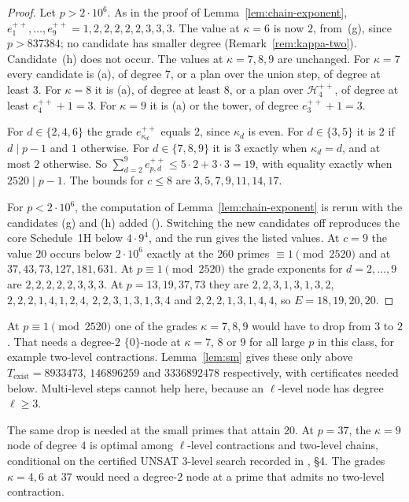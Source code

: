 \begin{proof}
Let $p > 2\cdot10^6$. As in the proof of Lemma~\ref{lem:chain-exponent}, $e^{++}_1,\dots,e^{++}_9 = 1,2,2,2,2,2,3,3,3$. The value at $\kappa = 6$ is now $2$, from~(g), since $p > 837384$; no candidate has smaller degree (Remark~\ref{rem:kappa-two}). Candidate~(h) does not occur. The values at $\kappa = 7, 8, 9$ are unchanged. For $\kappa = 7$ every candidate is (a), of degree $7$, or a plan over the union step, of degree at least $3$. For $\kappa = 8$ it is (a), of degree at least $8$, or a plan over $\mathcal H^{++}_4$, of degree at least $e^{++}_4 + 1 = 3$. For $\kappa = 9$ it is (a) or the tower, of degree $e^{++}_3 + 1 = 3$.

For $d \in \{2,4,6\}$ the grade $e^{++}_{\kappa_d}$ equals $2$, since $\kappa_d$ is even. For $d \in \{3,5\}$ it is $2$ if $d \mid p-1$ and $1$ otherwise. For $d \in \{7,8,9\}$ it is $3$ exactly when $\kappa_d = d$, and at most $2$ otherwise. So $\sum_{d=2}^9e^{++}_{p,d} \le 5\cdot2 + 3\cdot3 = 19$, with equality exactly when $2520 \mid p-1$. The bounds for $c \le 8$ are $3,5,7,9,11,14,17$.

For $p < 2\cdot10^6$, the computation of Lemma~\ref{lem:chain-exponent} is rerun with the candidates (g) and (h) added (). Switching the new candidates off reproduces the core Schedule~1H below $4\cdot9^4$, and the run gives the listed values. At $c = 9$ the value $20$ occurs below $2\cdot10^6$ exactly at the $260$ primes $\equiv 1 \pmod{2520}$ and at $37, 43, 73, 127, 181, 631$. At $p \equiv 1 \pmod{2520}$ the grade exponents for $d = 2,\dots,9$ are $2,2,2,2,2,3,3,3$. At $p = 13, 19, 37, 73$ they are $2,2,3,1,3,1,3,2$, $2,2,2,1,4,1,2,4$, $2,2,3,1,3,1,3,4$ and $2,2,2,1,3,1,4,4$, so $E = 18, 19, 20, 20$.
\end{proof}

\begin{remark}
\label{rem:below-20}
At $p \equiv 1 \pmod{2520}$ one of the grades $\kappa = 7, 8, 9$ would have to drop from $3$ to $2$. That needs a degree-$2$ $\{0\}$-node at $\kappa = 7$, $8$ or $9$ for all large $p$ in this class, for example two-level contractions. Lemma~\ref{lem:sm} gives these only above $T_{\mathrm{exist}} = 8933473$, $146896259$ and $3336892478$ respectively, with certificates needed below. Multi-level steps cannot help here, because an $\ell$-level node has degree $\ell \ge 3$.

The same drop is needed at the small primes that attain $20$. At $p = 37$, the $\kappa = 9$ node of degree $4$ is optimal among $\ell$-level contractions and two-level chains, conditional on the certified UNSAT 3-level search recorded in , \S4. The grades $\kappa = 4, 6$ at $37$ would need a degree-$2$ node at a prime that admits no two-level contraction.
\end{remark}

